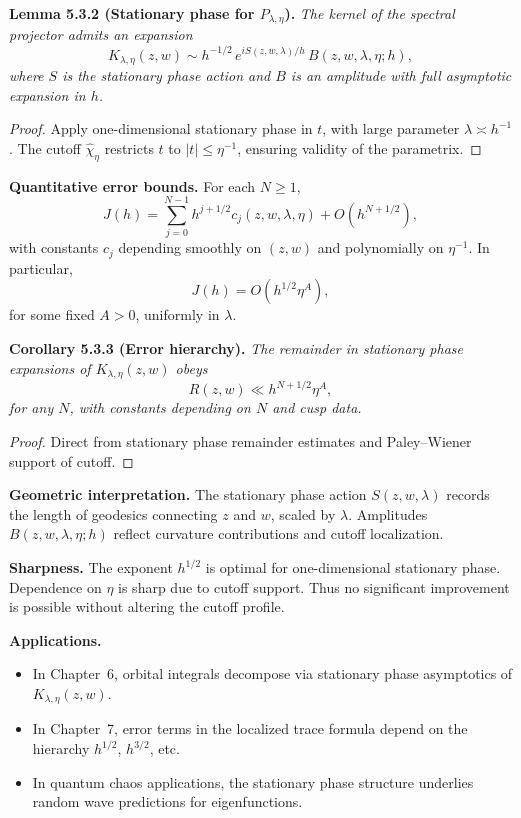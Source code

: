 \noindent\textbf{Lemma 5.3.2 (Stationary phase for $P_{\lambda,\eta}$).}
\emph{The kernel of the spectral projector admits an expansion}
\[
  K_{\lambda,\eta}(z,w) \sim h^{-1/2}\,
  e^{i S(z,w,\lambda)/h}\,
  B(z,w,\lambda,\eta;h),
\]
\emph{where $S$ is the stationary phase action
and $B$ is an amplitude with full asymptotic expansion in $h$.}

\begin{proof}
Apply one-dimensional stationary phase in $t$,
with large parameter $\lambda\asymp h^{-1}$.
The cutoff $\widehat{\chi}_\eta$ restricts $t$ to $|t|\le \eta^{-1}$,
ensuring validity of the parametrix.
\end{proof}

\medskip

\noindent\textbf{Quantitative error bounds.}
For each $N\ge 1$,
\[
  J(h) = \sum_{j=0}^{N-1} h^{j+1/2} c_j(z,w,\lambda,\eta)
  + O(h^{N+1/2}),
\]
with constants $c_j$ depending smoothly on $(z,w)$
and polynomially on $\eta^{-1}$.
In particular,
\[
  J(h) = O(h^{1/2}\eta^A),
\]
for some fixed $A>0$,
uniformly in $\lambda$.

\medskip

\noindent\textbf{Corollary 5.3.3 (Error hierarchy).}
\emph{The remainder in stationary phase expansions of $K_{\lambda,\eta}(z,w)$
obeys}
\[
  R(z,w) \ll h^{N+1/2} \eta^A,
\]
\emph{for any $N$, with constants depending on $N$ and cusp data.}

\begin{proof}
Direct from stationary phase remainder estimates and Paley–Wiener support of cutoff.
\end{proof}

\medskip

\noindent\textbf{Geometric interpretation.}
The stationary phase action $S(z,w,\lambda)$
records the length of geodesics connecting $z$ and $w$,
scaled by $\lambda$.
Amplitudes $B(z,w,\lambda,\eta;h)$
reflect curvature contributions and cutoff localization.

\medskip

\noindent\textbf{Sharpness.}
The exponent $h^{1/2}$ is optimal for one-dimensional stationary phase.
Dependence on $\eta$ is sharp due to cutoff support.
Thus no significant improvement is possible without altering the cutoff profile.

\medskip

\noindent\textbf{Applications.}
\begin{itemize}
  \item In Chapter~6, orbital integrals decompose via stationary phase asymptotics of $K_{\lambda,\eta}(z,w)$.
  \item In Chapter~7, error terms in the localized trace formula depend on the hierarchy $h^{1/2}$, $h^{3/2}$, etc.
  \item In quantum chaos applications, the stationary phase structure underlies random wave predictions for eigenfunctions.
\end{itemize}

